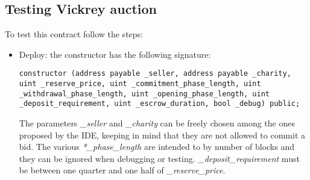 \documentclass{article}
\begin{document}
\subsection{Testing Vickrey auction}
To test this contract follow the steps:
\begin{itemize}
    \item Deploy: the constructor has the following signature:
        \begin{lstlisting}[language=Solidity]
constructor (address payable _seller, address payable _charity, uint _reserve_price, uint _commitment_phase_length, uint _withdrawal_phase_length, uint _opening_phase_length, uint _deposit_requirement, uint _escrow_duration, bool _debug) public;
        \end{lstlisting}
        The parameters \textit{\_seller} and \textit{\_charity} can be freely chosen among the ones proposed by the IDE, keeping in mind that they are not allowed to commit a bid. The various \textit{*\_phase\_length} are intended to by number of blocks and they can be ignored when debugging or testing.
        \textit{\_deposit\_requirement} must be between one quarter and one half of \textit{\_reserve\_price}.
        

\end{itemize}
\end{document}
